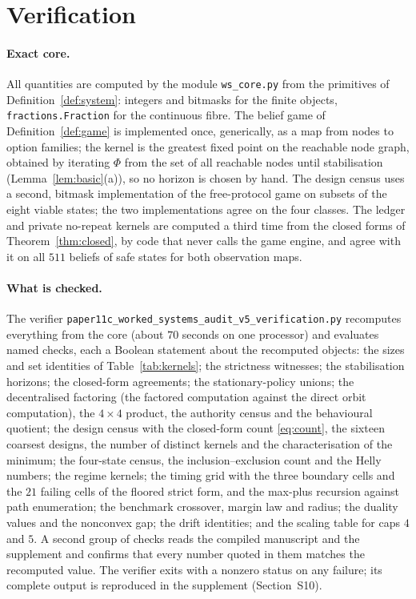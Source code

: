 \section{Verification}\label{sec:verification}

\paragraph{Exact core.}
All quantities are computed by the module \texttt{ws\_core.py} from the primitives of Definition~\ref{def:system}: integers and bitmasks for the finite objects, \texttt{fractions.Fraction} for the continuous fibre. The belief game of Definition~\ref{def:game} is implemented once, generically, as a map from nodes to option families; the kernel is the greatest fixed point on the reachable node graph, obtained by iterating $\Phi$ from the set of all reachable nodes until stabilisation (Lemma~\ref{lem:basic}(a)), so no horizon is chosen by hand. The design census uses a second, bitmask implementation of the free-protocol game on subsets of the eight viable states; the two implementations agree on the four classes. The ledger and private no-repeat kernels are computed a third time from the closed forms of Theorem~\ref{thm:closed}, by code that never calls the game engine, and agree with it on all $511$ beliefs of safe states for both observation maps.

\paragraph{What is checked.}
The verifier \texttt{paper11c\_worked\_systems\_audit\_v5\_verification.py} recomputes everything from the core (about $70$ seconds on one processor) and evaluates \NCHECKS{} named checks, each a Boolean statement about the recomputed objects: the sizes and set identities of Table~\ref{tab:kernels}; the strictness witnesses; the stabilisation horizons; the closed-form agreements; the stationary-policy unions; the decentralised factoring (the factored computation against the direct orbit computation), the $4\times4$ product, the authority census and the behavioural quotient; the design census with the closed-form count \eqref{eq:count}, the sixteen coarsest designs, the number of distinct kernels and the characterisation of the minimum; the four-state census, the inclusion--exclusion count and the Helly numbers; the regime kernels; the timing grid with the three boundary cells and the $21$ failing cells of the floored strict form, and the max-plus recursion against path enumeration; the benchmark crossover, margin law and radius; the duality values and the nonconvex gap; the drift identities; and the scaling table for caps $4$ and $5$. A second group of checks reads the compiled manuscript and the supplement and confirms that every number quoted in them matches the recomputed value. The verifier exits with a nonzero status on any failure; its complete output is reproduced in the supplement (Section~S10).

